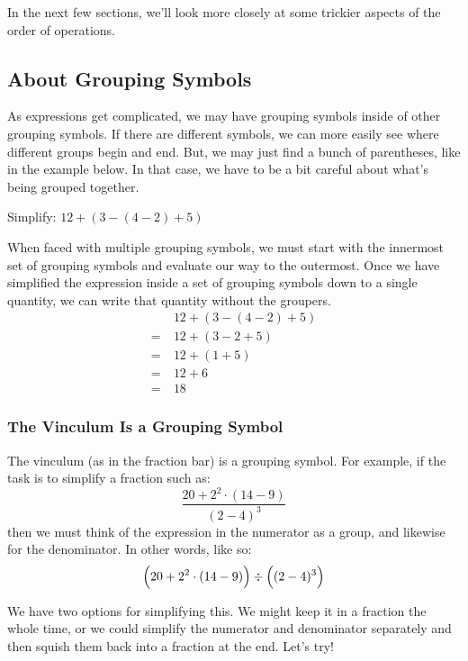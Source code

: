 In the next few sections, we'll look more closely at some trickier aspects of the order of operations.

\subsection{About Grouping Symbols}

As expressions get complicated, we may have grouping symbols inside of other grouping symbols. If there are different symbols, we can more easily see where different groups begin and end. But, we may just find a bunch of parentheses, like in the example below. In that case, we have to be a bit careful about what's being grouped together.

\begin{boxedex}
Simplify: $12+(3-(4-2)+5)$

\exsoln{} When faced with multiple grouping symbols, we must start with the innermost set of grouping symbols and evaluate our way to the outermost. Once we have simplified the expression inside a set of grouping symbols down to a single quantity, we can write that quantity without the groupers.
\[\begin{aligned}
	&~ 12+(3-(4-2)+5)\\
=	&~ 12+(3-2+5)\\
=	&~ 12+(1+5)\\
=	&~ 12+6\\
=	&~ 18
\end{aligned}\]
\end{boxedex}

\subsubsection{The Vinculum Is a Grouping Symbol}

The \gls{vinculum} (as in the fraction bar) is a grouping symbol. For example, if the task is to simplify a fraction such as: \[\frac{20+2^2\cdot(14-9)}{(2-4)^3}\] then we must think of the expression in the numerator as a group, and likewise for the denominator. In other words, like so: \[\Bigl(20+2^2\cdot(14-9)\Bigr)\div\Bigl((2-4)^3\Bigr)\]

We have two options for simplifying this. We might keep it in a fraction the whole time, or we could simplify the numerator and denominator separately and then squish them back into a fraction at the end. Let's try!

